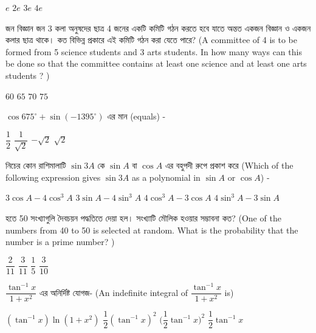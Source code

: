 \documentclass[addpoints]{exam}
\begin{document}
\begin{questions}
\begin{oneparchoices}
\choice $ e $
\choice $ 2e $
\choice $ 3e $
\choice $ 4e $
\end{oneparchoices}

 জন বিজ্ঞান জন 3 কলা অনুষদের ছাত্র 4  জনের একটি কমিটি গঠন করতে হবে যাতে অন্তত একজন বিজ্ঞান ও একজন কলার ছাত্র থাকে। কত বিভিন্ন প্রকারে এই কমিটি গঠন করা যেতে পারে? (A committee of 4 is to be formed from 5 science students and 3 arts students. In how many ways can this be done so that the committee contains at least one science and at least one arts students ? ) 

\begin{oneparchoices}
\choice $ 60 $
\choice $ 65 $
\choice $ 70 $
\choice $ 75 $
\end{oneparchoices}

\question $ \cos 675^{\circ} +\sin (-1395^{\circ})$ এর মান (equals) - 


\begin{oneparchoices}
\choice $ \dfrac{1}{2} $
\choice $ \dfrac{1}{\sqrt{2}} $
\choice $ -\sqrt{2} $
\choice $ \sqrt{2} $
\end{oneparchoices}



\question নিচের কোন রাশিমালাটি $ \sin 3A $ কে $ \sin A $ বা $ \cos A $ এর বহুপদী রুপে প্রকাশ করে (Which of the following expression gives  $ \sin 3A $ as a polynomial in $ \sin A $ or $ \cos A $) -

\begin{oneparchoices}
\choice  $ 3\cos A -4\cos^{3} A $
\choice  $ 3\sin A -4\sin^{3} A $
\choice  $ 4\cos^{3} A -3\cos A $
\choice  $ 4\sin^{3} A -3\sin A $
\end{oneparchoices}

 হতে 50 সংখ্যাগুলি দৈবচয়ন পদ্ধতিতে দেয়া হল। সংখ্যাটি মৌলিক হওয়ার সম্ভাবনা কত? (One of the numbers from 40 to 50 is selected at random. What is the probability that the number is a prime number? )

\begin{oneparchoices}
\choice $ \dfrac{2}{11} $ 
\choice $ \dfrac{3}{11} $ 
\choice $ \dfrac{1}{5} $
\choice $ \dfrac{3}{10} $
\end{oneparchoices}

\question $ \dfrac{\tan^{-1}x}{1+x^{2}} $ এর অনির্দিষ্ট যোগজ- (An indefinite integral of $ \dfrac{\tan^{-1}x}{1+x^{2}} $ is)

\begin{oneparchoices}
\choice $ (\tan^{-1}x)\ln(1+x^{2}) $ 
\choice $ \dfrac{1}{2} (\tan^{-1}x)^{2} $
\choice $ \Big(\dfrac{1}{2}\tan^{-1}x\Big)^{2} $
\choice $ \dfrac{1}{2}\tan^{-1}x $ 
\end{oneparchoices}




\end{questions}
\end{document}
